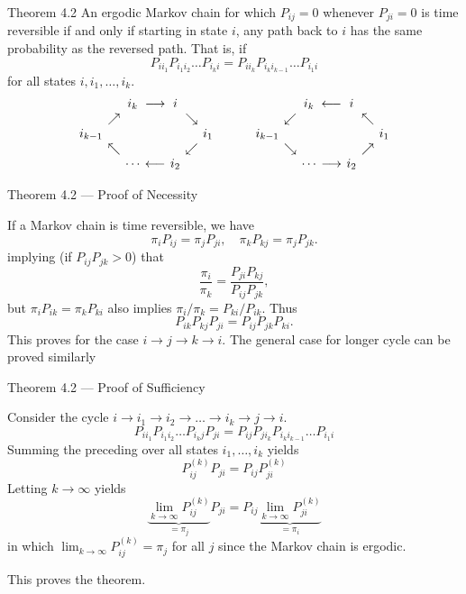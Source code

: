 \documentclass[letterpaper, mathserif]{beamer}
\begin{document}
\begin{frame}{Theorem 4.2}
An ergodic Markov chain for which $P_{ij} = 0$ whenever $P_{ji} = 0$ is
time reversible if and only if starting in state $i$, any path back to $i$ has the same
probability as the reversed path. That is, if
$$P_{ii_1}P_{i_1i_2}\ldots P_{i_ki} = P_{ii_k}P_{i_ki_{k-1}}\ldots P_{i_1i} $$
for all states $i, i_1,\ldots, i_k$.
$$
\arraycolsep=2pt
\begin{array}{rcccccc}
&& i_k & \longrightarrow & i & \\
&\nearrow&&&&\searrow&\\
i_{k-1} &&&&&& i_1\\
&\nwarrow&&&&\swarrow&\\
&& \cdots & \longleftarrow & i_2 & 
\end{array}
\qquad\quad
\begin{array}{ccccccc}
&& i_k & \longleftarrow & i & \\
&\swarrow&&&&\nwarrow&\\
i_{k-1} &&&&&& i_1\\
&\searrow&&&&\nearrow&\\
&& \cdots & \longrightarrow & i_2 & 
\end{array}
$$
\end{frame}
\begin{frame}{Theorem 4.2 --- Proof of Necessity}

If a Markov chain is time reversible, we have
$$\pi_iP_{ij} = \pi_jP_{ji},\quad \pi_kP_{kj} = \pi_jP_{jk}.$$
implying (if $P_{ij}P_{jk} > 0$) that
$$\frac{\pi_i}{\pi_k}= \frac{P_{ji}P_{kj}}{P_{ij}P_{jk}},$$
but $\pi_iP_{ik} = \pi_kP_{ki}$ also implies $\pi_i/\pi_k=P_{ki}/P_{ik}$.
Thus $$P_{ik}P_{kj}P_{ji} = P_{ij}P_{jk}P_{ki}.$$
This proves for the case $i\to j\to k\to i$.
The general case for longer cycle can be proved similarly
\end{frame}
\begin{frame}{Theorem 4.2 --- Proof of Sufficiency}

Consider the cycle $i\to i_1\to i_2\to\ldots\to i_k\to j\to i$.
$$P_{ii_1}P_{i_1i_2}\ldots P_{i_kj}P_{ji} = P_{ij}P_{ji_k}P_{i_ki_{k-1}}\ldots P_{i_1i}$$
Summing the preceding over all states $i_1,\ldots, i_k$ yields
$$P^{(k)}_{ij} P_{ji} = P_{ij}P^{(k)}_{ji}$$
Letting $k\to\infty$ yields
$$\underbrace{\lim_{k\to\infty} P^{(k)}_{ij}}_{=\pi_j} P_{ji} = P_{ij}\underbrace{\lim_{k\to\infty} P^{(k)}_{ji}}_{=\pi_i}$$
in which $\lim_{k\to\infty} P^{(k)}_{ij}=\pi_j$ for all $j$ since the Markov chain is ergodic.

This proves the theorem.
\end{frame}
\end{document}
